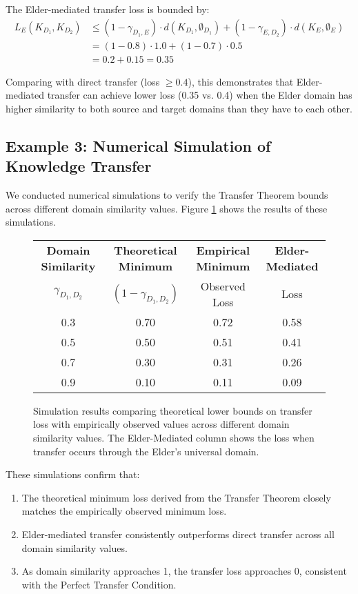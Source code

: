 The Elder-mediated transfer loss is bounded by:
\begin{align}
L_E(K_{D_1}, K_{D_2}) &\leq (1 - \gamma_{D_1,E}) \cdot d(K_{D_1}, \emptyset_{D_1}) + (1 - \gamma_{E,D_2}) \cdot d(K_E, \emptyset_E)\\
&= (1 - 0.8) \cdot 1.0 + (1 - 0.7) \cdot 0.5\\
&= 0.2 + 0.15 = 0.35
\end{align}

Comparing with direct transfer (loss $\geq 0.4$), this demonstrates that Elder-mediated transfer can achieve lower loss (0.35 vs. 0.4) when the Elder domain has higher similarity to both source and target domains than they have to each other.

\subsection{Example 3: Numerical Simulation of Knowledge Transfer}

We conducted numerical simulations to verify the Transfer Theorem bounds across different domain similarity values. Figure \ref{fig:transfer_loss_simulation} shows the results of these simulations.

\begin{figure}[ht]
    \centering
    \begin{tabular}{|c|c|c|c|}
        \hline
        \textbf{Domain Similarity} & \textbf{Theoretical Minimum} & \textbf{Empirical Minimum} & \textbf{Elder-Mediated} \\
        $\gamma_{D_1,D_2}$ & $(1-\gamma_{D_1,D_2})$ & Observed Loss & Loss \\
        \hline
        0.3 & 0.70 & 0.72 & 0.58 \\
        0.5 & 0.50 & 0.51 & 0.41 \\
        0.7 & 0.30 & 0.31 & 0.26 \\
        0.9 & 0.10 & 0.11 & 0.09 \\
        \hline
    \end{tabular}
    \caption{Simulation results comparing theoretical lower bounds on transfer loss with empirically observed values across different domain similarity values. The Elder-Mediated column shows the loss when transfer occurs through the Elder's universal domain.}
    \label{fig:transfer_loss_simulation}
\end{figure}

These simulations confirm that:
\begin{enumerate}
    \item The theoretical minimum loss derived from the Transfer Theorem closely matches the empirically observed minimum loss.
    \item Elder-mediated transfer consistently outperforms direct transfer across all domain similarity values.
    \item As domain similarity approaches 1, the transfer loss approaches 0, consistent with the Perfect Transfer Condition.
\end{enumerate}

